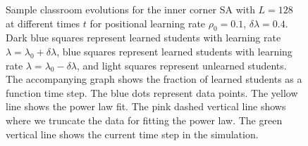 \begin{figure}[htbp!]
   \caption{Sample classroom evolutions for the inner corner SA with $L=128$ at different times $t$ for positional learning rate $\rho_0=0.1$, $\delta\lambda = 0.4$.
   Dark blue squares represent learned students with learning rate $\lambda = \lambda_0 + \delta\lambda$, blue squares represent learned students with learning rate $\lambda = \lambda_0 - \delta\lambda$, and light squares represent unlearned students.
   The accompanying graph shows the fraction of learned students as a function time step.
   The blue dots represent data points. 
   The yellow line shows the power law fit.
   The pink dashed vertical line shows where we truncate the data for fitting the power law.
   The green vertical line shows the current time step in the simulation.
   }
   \label{fig:2DBPCAIH sample class evolution low rho}
\end{figure}

